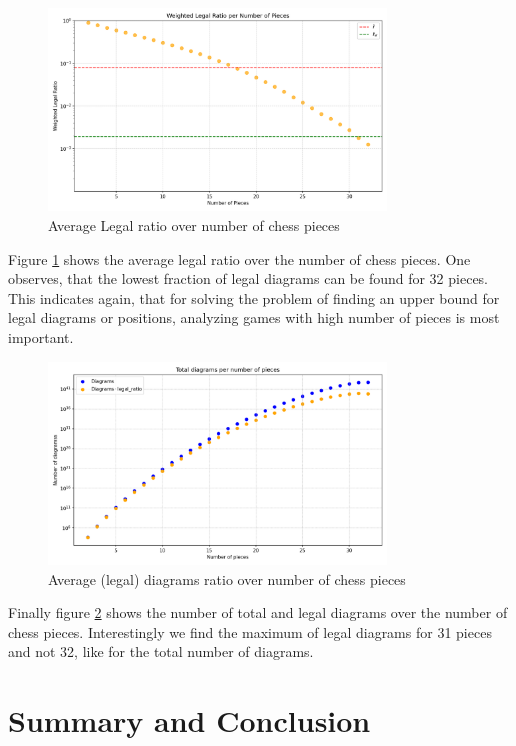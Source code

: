 \documentclass[12pt]{article}
\begin{document}
\begin{figure}[h!]
  \centering
  \includegraphics[width=0.8\textwidth]{valid_ratio_per_num_pieces.png}
  \caption{Average Legal ratio over number of chess pieces}
  \label{fig:legal_ratio_by_pieces}
\end{figure}
Figure \ref{fig:legal_ratio_by_pieces} shows the average legal ratio over the number of chess pieces. One observes, that the lowest fraction of legal diagrams can be found for 32 pieces. This indicates again, that for solving the problem of finding an upper bound for legal diagrams or positions, analyzing games with high number of pieces is most important.
\begin{figure}[h!]
  \centering
  \includegraphics[width=0.8\textwidth]{positions_per_num_pieces.png}
  \caption{Average (legal) diagrams ratio over number of chess pieces}
  \label{fig:diagrams_by_pieces}
\end{figure}

Finally figure \ref{fig:diagrams_by_pieces} shows the number of total and legal diagrams over the number of chess pieces. Interestingly we find the maximum of legal diagrams for 31 pieces and not 32, like for the total number of diagrams.

\section{Summary and Conclusion}
\end{document}
